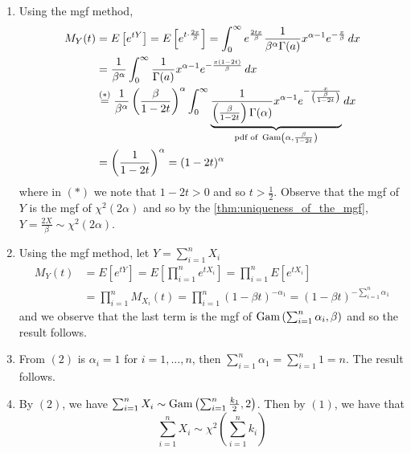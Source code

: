 \documentclass[notoc,notitlepage]{tufte-book}
\begin{document}
\begin{solution}
  \begin{enumerate}
    \item Using the mgf method,
      \begin{align*}
        M_Y(t) &= E\left[ e^{tY} \right] = E\left[ e^{t \cdot \frac{2x}{\beta}} \right] = \int_{0}^{\infty} e^{ \frac{2tx}{\beta} } \frac{1}{\beta^\alpha \Gamma(a)} x^{\alpha - 1} e^{- \frac{x}{\beta}} \mathop{}\!d{x} \\
               &= \frac{1}{\beta^\alpha} \int_{0}^{\infty} \frac{1}{\Gamma(a)} x^{\alpha - 1} e^{ - \frac{x ( 1 - 2t )}{\beta} } \mathop{}\!d{x} \\
               &\overset{(*)}{=} \frac{1}{\beta^\alpha} \left( \frac{\beta}{1 - 2t} \right)^\alpha \int_{0}^{\infty} \underbrace{ \frac{1}{\left( \frac{\beta}{1 - 2t} \right) \Gamma(\alpha)} x^{\alpha - 1} e^{ - \frac{x}{\left( \frac{\beta}{1 - 2t} \right)} } }_{\text{pdf of } \operatorname{Gam}\left(\alpha, \frac{\beta}{1 - 2t}\right)} \mathop{}\!d{x} \\
               &= \left( \frac{1}{1 - 2t} \right)^\alpha = ( 1 - 2t )^\alpha
      \end{align*}
      where in $(*)$ we note that $1 - 2t > 0$ and so $t > \frac{1}{2}$. Observe that the mgf of $Y$ is the mgf of $\chi^2 ( 2 \alpha )$ and so by the \cref{thm:uniqueness_of_the_mgf}, $Y = \frac{2X}{\beta} \sim \chi^2 (2 \alpha)$.
    \item Using the mgf method, let $Y = \sum_{i=1}^{n} X_i$
      \begin{align*}
        M_Y(t) &= E\left[ e^{tY} \right] = E\left[ \prod_{i=1}^{n} e^{tX_i} \right] = \prod_{i=1}^{n} E[ e^{tX_i} ] \\
               &= \prod_{i=1}^{n} M_{X_i}(t) = \prod_{i=1}^{n} ( 1 - \beta t )^{-\alpha_1} = (1 - \beta t)^{- \sum_{i=1}^{n} \alpha_1}
      \end{align*}
      and we observe that the last term is the mgf of $\operatorname{Gam}\left( \sum_{i=1}^{n} \alpha_i, \beta \right)$ and so the result follows.
    \item From $(2)$ is $\alpha_i = 1$ for $i = 1, ..., n$, then $\sum_{i=1}^{n} \alpha_1 = \sum_{i=1}^{n} 1 = n$. The result follows.
    \item By $(2)$, we have $\sum_{i=1}^{n} X_i \sim \operatorname{Gam}\left( \sum_{i=1}^{n} \frac{k_1}{2}, 2 \right)$. Then by $(1)$, we have that
      \begin{equation*}
        \sum_{i=1}^{n} X_i \sim \chi^2\left( \sum_{i=1}^{n} k_i \right)
      \end{equation*}

\end{enumerate}
\end{solution}
\end{document}
